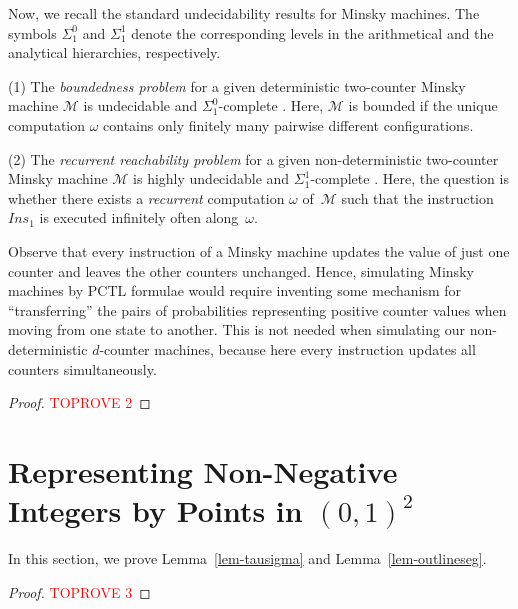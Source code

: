 \documentclass[a4paper,UKenglish,cleveref, autoref, thm-restate]{lipics-v2021}
\newcommand{\M}{\mathcal{M}}
\newcommand{\Ins}{\mathit{Ins}}
\begin{document}
Now, we recall the standard undecidability results for Minsky machines. The symbols $\Sigma_1^0$ and $\Sigma_1^1$ denote the corresponding levels in the arithmetical and the analytical hierarchies, respectively.
\smallskip




(1) The \emph{boundedness problem} for a given deterministic two-counter Minsky machine $\M$ is undecidable and $\Sigma_1^0$-complete \cite{KSCh:Minsky-boundedness-PCS}. Here, $\M$ is bounded if the unique computation $\omega$ contains only finitely many pairwise different configurations.
\smallskip

(2) The \emph{recurrent reachability problem} for a given non-deterministic \mbox{two-counter} Minsky machine $\M$ is highly undecidable and $\Sigma_1^1$-complete \cite{Harel:Infinite-trees-JACM}. Here, the question is whether there exists a \emph{recurrent} computation $\omega$ of~$\M$ such that the instruction $\Ins_1$ is executed infinitely often along~$\omega$.

Observe that every instruction of a Minsky machine updates the value of just one counter and leaves the other counters unchanged. Hence, simulating Minsky machines by PCTL formulae would require inventing some mechanism for ``transferring'' the pairs of probabilities representing positive counter values when moving from one state to another. This is not needed when simulating our non-deterministic $d$-counter machines, because here every instruction updates all counters simultaneously.

\Minsky*

\begin{proof}\textcolor{red}{TOPROVE 2}\end{proof}

 \section{Representing Non-Negative Integers by Points in $(0,1)^2$}
\label{app-area}

In this section, we prove Lemma~\ref{lem-tausigma} and Lemma~\ref{lem-outlineseg}.


\incfunction*
\begin{proof}\textcolor{red}{TOPROVE 3}\end{proof}
\end{document}

